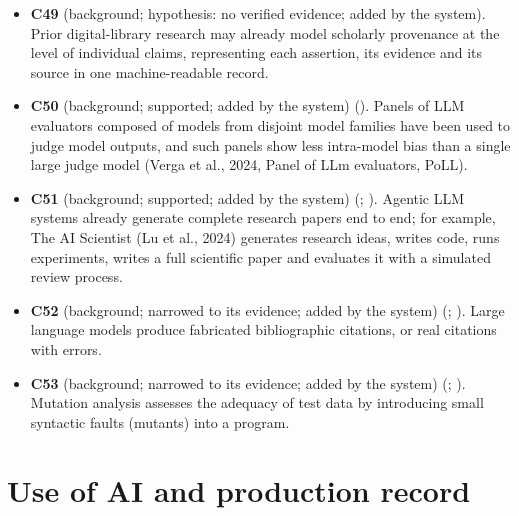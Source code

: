 \documentclass[
]{article}
\begin{document}
\begin{itemize}
  human--AI co-writing records provenance of what an LLM generated in a
  document.
\item
  \textbf{C49} (background; hypothesis: no verified evidence; added by
  the system). Prior digital-library research may already model
  scholarly provenance at the level of individual claims, representing
  each assertion, its evidence and its source in one machine-readable
  record.
\item
  \textbf{C50} (background; supported; added by the system)
  (). Panels of LLM
  evaluators composed of models from disjoint model families have been
  used to judge model outputs, and such panels show less intra-model
  bias than a single large judge model (Verga et al., 2024, Panel of LLm
  evaluators, PoLL).
\item
  \textbf{C51} (background; supported; added by the system)
  (;
  ). Agentic LLM
  systems already generate complete research papers end to end; for
  example, The AI Scientist (Lu et al., 2024) generates research ideas,
  writes code, runs experiments, writes a full scientific paper and
  evaluates it with a simulated review process.
\item
  \textbf{C52} (background; narrowed to its evidence; added by the
  system) (; ).
  Large language models produce fabricated bibliographic citations, or
  real citations with errors.
\item
  \textbf{C53} (background; narrowed to its evidence; added by the
  system) (;
  ). Mutation
  analysis assesses the adequacy of test data by introducing small
  syntactic faults (mutants) into a program.
\end{itemize}

\section*{Use of AI and production
record}\label{use-of-ai-and-production-record}
\end{document}
